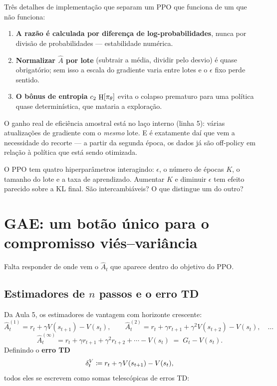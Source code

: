 \documentclass[11pt]{article}
\newcommand{\thv}{\theta}
\newcommand{\polth}{\pol_{\thv}}
\newcommand{\Ahat}{\hat{A}}
\DeclareMathOperator{\ent}{H}
\begin{document}
Três detalhes de implementação que separam um PPO que funciona de um que não funciona:

\begin{enumerate}
  \item \textbf{A razão é calculada por diferença de log-probabilidades}, nunca por
    divisão de probabilidades --- estabilidade numérica.
  \item \textbf{Normalizar $\Ahat$ por lote} (subtrair a média, dividir pelo desvio) é
    quase obrigatório; sem isso a escala do gradiente varia entre lotes e o
    $\epsilon$ fixo perde sentido.
  \item \textbf{O bônus de entropia} $c_2\,\ent[\polth]$ evita o colapso prematuro para
    uma política quase determinística, que mataria a exploração.
\end{enumerate}

\begin{alertabox}
  O ganho real de eficiência amostral está no laço interno (linha 5): várias atualizações
  de gradiente com o \emph{mesmo} lote. E é exatamente daí que vem a necessidade do
  recorte --- a partir da segunda época, os dados já são off-policy em relação à política
  que está sendo otimizada.
\end{alertabox}

\begin{discbox}
  O PPO tem quatro hiperparâmetros interagindo: $\epsilon$, o número de épocas $K$, o
  tamanho do lote e a taxa de aprendizado. Aumentar $K$ e diminuir $\epsilon$ tem efeito
  parecido sobre a KL final. São intercambiáveis? O que distingue um do outro?
\end{discbox}

\section{GAE: um botão único para o compromisso viés--variância}
\label{sec:gae}

Falta responder de onde vem o $\Ahat_t$ que aparece dentro do objetivo do PPO.

\subsection{Estimadores de $n$ passos e o erro TD}

Da Aula 5, os estimadores de vantagem com horizonte crescente:
\[
  \Ahat^{(1)}_t = r_t + \gamma V(s_{t+1}) - V(s_t), \qquad
  \Ahat^{(2)}_t = r_t + \gamma r_{t+1} + \gamma^2 V(s_{t+2}) - V(s_t), \quad\dots
\]
\[
  \Ahat^{(\infty)}_t = r_t + \gamma r_{t+1} + \gamma^2 r_{t+2} + \cdots - V(s_t)
    \;=\; G_t - V(s_t).
\]
Definindo o \textbf{erro TD}
\[
  \delta^V_t \coloneqq r_t + \gamma V(s_{t+1}) - V(s_t),
\]
todos eles se escrevem como somas telescópicas de erros TD:
\end{document}
